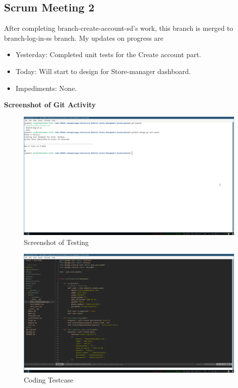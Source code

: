 \documentclass[a4paper,12pt]{article}
\begin{document}
\subsection{Scrum Meeting 2}
After completing branch-create-account-sd's work, this branch is merged to branch-log-in-ss branch.
My updates on progress are
\begin{itemize}
    \item Yesterday: Completed unit tests for the Create account part.
    \item Today: Will start to design for Store-manager dashboard.
    \item Impediments: None.
\end{itemize}
\textbf{\large{Screenshot of Git Activity}}
\begin{figure}[H]
    \centering
    \includegraphics[width=\textwidth]{spr1meet21.png}
    \caption{Screenshot of Testing}
\end{figure}
\begin{figure}[H]
    \centering
    \includegraphics[width=\textwidth]{spr1meet22.png}
    \caption{Coding Testcase}
\end{figure}
\newpage
\end{document}

